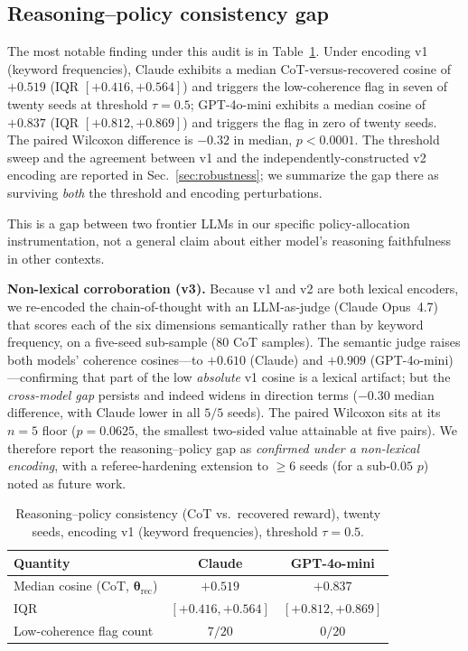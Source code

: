 \documentclass[conference]{IEEEtran}
\begin{document}
\subsection{Reasoning--policy consistency gap}
\label{sec:rpc-gap}

The most notable finding under this audit is in Table~\ref{tab:cot}.
Under encoding v1 (keyword frequencies), Claude exhibits a median
CoT-versus-recovered cosine of $+0.519$ (IQR $[+0.416, +0.564]$) and
triggers the low-coherence flag in seven of twenty seeds at threshold
$\tau{=}0.5$; GPT-4o-mini exhibits a median cosine of $+0.837$ (IQR
$[+0.812, +0.869]$) and triggers the flag in zero of twenty seeds. The paired Wilcoxon difference is $-0.32$ in median,
$p < 0.0001$. The threshold sweep and the agreement between v1 and
the independently-constructed v2 encoding are reported in
Sec.~\ref{sec:robustness}; we summarize the gap there as surviving
\emph{both} the threshold and encoding perturbations.

This is a gap between two frontier LLMs in our specific
policy-allocation instrumentation, not a general claim about either
model's reasoning faithfulness in other contexts.

\textbf{Non-lexical corroboration (v3).} Because v1 and v2 are both
lexical encoders, we re-encoded the chain-of-thought with an
LLM-as-judge (Claude Opus~4.7) that scores each of the six dimensions
semantically rather than by keyword frequency, on a five-seed
sub-sample (80 CoT samples). The semantic judge raises both models'
coherence cosines---to $+0.610$ (Claude) and $+0.909$
(GPT-4o-mini)---confirming that part of the low \emph{absolute} v1
cosine is a lexical artifact; but the \emph{cross-model gap} persists
and indeed widens in direction terms ($-0.30$ median difference, with
Claude lower in all $5/5$ seeds). The paired Wilcoxon sits at its
$n{=}5$ floor ($p{=}0.0625$, the smallest two-sided value attainable
at five pairs). We therefore report the reasoning--policy gap as
\emph{confirmed under a non-lexical encoding}, with a referee-hardening
extension to $\ge 6$ seeds (for a sub-$0.05$ $p$) noted as future work.

\begin{table}[h]
\centering
\caption{Reasoning--policy consistency (CoT vs.\ recovered reward), twenty seeds, encoding v1 (keyword frequencies), threshold $\tau{=}0.5$.}
\label{tab:cot}
\begin{tabular}{lcc}
\toprule
Quantity & Claude & GPT-4o-mini \\
\midrule
Median cosine (CoT, $\boldsymbol{\theta}_{\text{rec}}$) & $+0.519$ & $+0.837$ \\
IQR                                                     & $[+0.416, +0.564]$ & $[+0.812, +0.869]$ \\
Low-coherence flag count                                & $7/20$ & $0/20$ \\
\bottomrule
\end{tabular}
\end{table}
\end{document}
